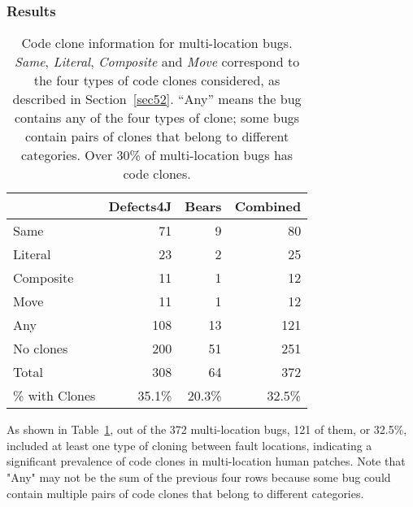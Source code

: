 \documentclass[sigconf, timestamp-false, anonymous=true]{acmart}
\begin{document}
\subsubsection{Results}

\begin{table}
{\begin{center}
\begin{tabular} {lrrr}
\toprule
& Defects4J & Bears & Combined \\
\midrule
Same & 71 & 9 & 80  \\ 
Literal & 23 & 2 & 25  \\
Composite & 11 & 1 & 12  \\
Move & 11 & 1 & 12  \\
\midrule
Any & 108 & 13 & 121  \\
No clones & 200  &  51 & 251 \\
Total & 308 & 64 & 372 \\
\% with Clones & 35.1\% & 20.3\% & 32.5\% \\
\bottomrule
\end{tabular}
\end{center}
}
\caption{Code clone information for multi-location bugs. 
     \emph{Same}, \emph{Literal}, \emph{Composite} and \emph{Move} correspond to the
    four types of code clones considered, as described in Section~\ref{sec52}. ``Any'' means the bug
    contains any of the four types of clone; some bugs contain
    pairs of clones that belong to different categories. 
    Over
    30\% of multi-location bugs has code clones.}
\label{tab:clones}
\end{table}

As shown in Table~\ref{tab:clones}, out of the 372 multi-location bugs,
121 of them, or  32.5\%, included at least one type of cloning between fault locations, indicating a 
significant 
prevalence of code clones in multi-location human patches.
Note that "Any" may not
be the sum of the previous four rows because some bug could contain multiple pairs of code clones 
that
belong to different categories.
\end{document}
